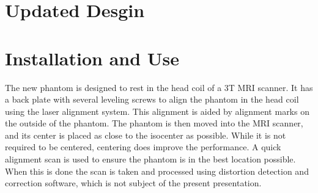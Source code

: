 \section{Updated Desgin}






\section{Installation and Use}

The new phantom is designed to rest in the head coil of a 3T MRI scanner.  It has a back plate with several 
leveling screws to align the phantom in the head coil using the laser alignment system.  This alignment is 
aided by alignment marks on the outside of the phantom. The phantom is then moved into the MRI scanner, 
and its center is placed as close to the isocenter as possible.  While it is not required to be centered, 
centering does improve the performance.  A quick alignment scan is used to ensure the phantom is in the best 
location possible.  When this is done the scan is taken and processed using distortion detection and 
correction software, which is not subject of the present presentation.


